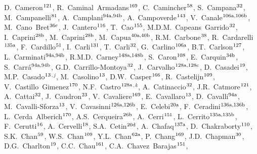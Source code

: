 \begin{flushleft}
D.~Cameron$^\textrm{\scriptsize 121}$,
R.~Caminal~Armadans$^\textrm{\scriptsize 169}$,
C.~Camincher$^\textrm{\scriptsize 58}$,
S.~Campana$^\textrm{\scriptsize 32}$,
M.~Campanelli$^\textrm{\scriptsize 81}$,
A.~Camplani$^\textrm{\scriptsize 94a,94b}$,
A.~Campoverde$^\textrm{\scriptsize 143}$,
V.~Canale$^\textrm{\scriptsize 106a,106b}$,
M.~Cano~Bret$^\textrm{\scriptsize 36c}$,
J.~Cantero$^\textrm{\scriptsize 116}$,
T.~Cao$^\textrm{\scriptsize 155}$,
M.D.M.~Capeans~Garrido$^\textrm{\scriptsize 32}$,
I.~Caprini$^\textrm{\scriptsize 28b}$,
M.~Caprini$^\textrm{\scriptsize 28b}$,
M.~Capua$^\textrm{\scriptsize 40a,40b}$,
R.M.~Carbone$^\textrm{\scriptsize 38}$,
R.~Cardarelli$^\textrm{\scriptsize 135a}$,
F.~Cardillo$^\textrm{\scriptsize 51}$,
I.~Carli$^\textrm{\scriptsize 131}$,
T.~Carli$^\textrm{\scriptsize 32}$,
G.~Carlino$^\textrm{\scriptsize 106a}$,
B.T.~Carlson$^\textrm{\scriptsize 127}$,
L.~Carminati$^\textrm{\scriptsize 94a,94b}$,
R.M.D.~Carney$^\textrm{\scriptsize 148a,148b}$,
S.~Caron$^\textrm{\scriptsize 108}$,
E.~Carquin$^\textrm{\scriptsize 34b}$,
S.~Carr\'a$^\textrm{\scriptsize 94a,94b}$,
G.D.~Carrillo-Montoya$^\textrm{\scriptsize 32}$,
J.~Carvalho$^\textrm{\scriptsize 128a,128c}$,
D.~Casadei$^\textrm{\scriptsize 19}$,
M.P.~Casado$^\textrm{\scriptsize 13}$$^{,j}$,
M.~Casolino$^\textrm{\scriptsize 13}$,
D.W.~Casper$^\textrm{\scriptsize 166}$,
R.~Castelijn$^\textrm{\scriptsize 109}$,
V.~Castillo~Gimenez$^\textrm{\scriptsize 170}$,
N.F.~Castro$^\textrm{\scriptsize 128a}$$^{,k}$,
A.~Catinaccio$^\textrm{\scriptsize 32}$,
J.R.~Catmore$^\textrm{\scriptsize 121}$,
A.~Cattai$^\textrm{\scriptsize 32}$,
J.~Caudron$^\textrm{\scriptsize 23}$,
V.~Cavaliere$^\textrm{\scriptsize 169}$,
E.~Cavallaro$^\textrm{\scriptsize 13}$,
D.~Cavalli$^\textrm{\scriptsize 94a}$,
M.~Cavalli-Sforza$^\textrm{\scriptsize 13}$,
V.~Cavasinni$^\textrm{\scriptsize 126a,126b}$,
E.~Celebi$^\textrm{\scriptsize 20a}$,
F.~Ceradini$^\textrm{\scriptsize 136a,136b}$,
L.~Cerda~Alberich$^\textrm{\scriptsize 170}$,
A.S.~Cerqueira$^\textrm{\scriptsize 26b}$,
A.~Cerri$^\textrm{\scriptsize 151}$,
L.~Cerrito$^\textrm{\scriptsize 135a,135b}$,
F.~Cerutti$^\textrm{\scriptsize 16}$,
A.~Cervelli$^\textrm{\scriptsize 18}$,
S.A.~Cetin$^\textrm{\scriptsize 20d}$,
A.~Chafaq$^\textrm{\scriptsize 137a}$,
D.~Chakraborty$^\textrm{\scriptsize 110}$,
S.K.~Chan$^\textrm{\scriptsize 59}$,
W.S.~Chan$^\textrm{\scriptsize 109}$,
Y.L.~Chan$^\textrm{\scriptsize 62a}$,
P.~Chang$^\textrm{\scriptsize 169}$,
J.D.~Chapman$^\textrm{\scriptsize 30}$,
D.G.~Charlton$^\textrm{\scriptsize 19}$,
C.C.~Chau$^\textrm{\scriptsize 161}$,
C.A.~Chavez~Barajas$^\textrm{\scriptsize 151}$,

\end{flushleft}
